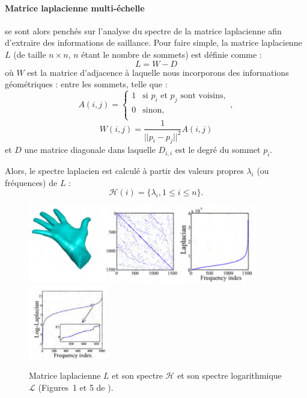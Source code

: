 \paragraph{Matrice laplacienne multi-échelle}
%
 se sont alors penchés sur l'analyse du spectre de la
matrice laplacienne afin d'extraire des informations de saillance. Pour faire
simple, la matrice laplacienne $L$ (de taille $n \times n$, $n$ étant le nombre
de sommets) est définie comme :
%
\begin{equation}
  L = W - D
\end{equation}
%
où $W$ est la matrice d’adjacence à laquelle nous incorporons des informations
géométriques : entre les sommets, telle que :
%
\begin{equation}
  A(i,j) =
  \begin{cases}
    1   & \text{si } p_i \text{ et } p_j \text{ sont voisins},\\
    0   & \text{sinon},\\
  \end{cases},
\end{equation}
%
\begin{equation}
  W(i,j) = \frac{1}{{||p_i - p_j||}^2}A(i,j)
\end{equation}
%
et $D$ une matrice diagonale dans laquelle $D_{i,i}$ est le degré du sommet
$p_i$.


Alors, le spectre laplacien est calculé à partir des valeurs propres $\lambda_i$
(ou fréquences) de $L$ :
%
\begin{equation}
  \mathcal{H}(i) = \{ \lambda_i, 1 \le i \le n \}.
\end{equation}

\begin{figure}[ht]{
    \begin{center}
    \includegraphics[width=10cm]{images/Feature/LaplacianSpectrum}
    \includegraphics[width=3.5cm]{images/Feature/LaplacianSpectrumLog}
    \end{center}}
    \caption[Matrice laplacienne et son spectre.]{Matrice laplacienne $L$ et son spectre $\mathcal{H}$ et son spectre logarithmique $\mathcal{L}$ (Figures~1 et 5 de \cite{Song2014}).
      \label{fig:laplacian-spectrum}}
\end{figure}

